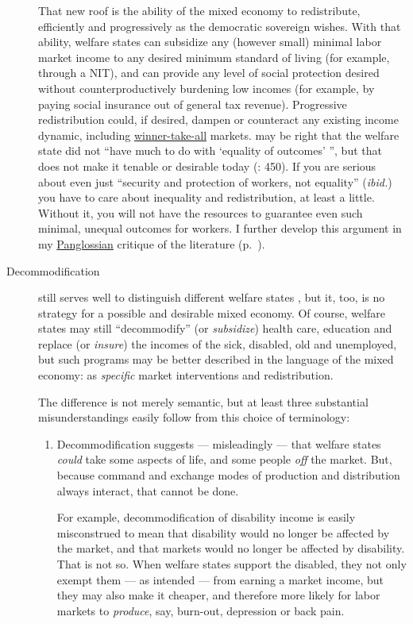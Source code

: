\begin{description}
	That new roof is the ability of the mixed economy to redistribute, efficiently and progressively as the democratic sovereign wishes. With that ability, welfare states can subsidize any (however small) minimal labor market income to any desired minimum standard of living (for example, through a \gls{NIT}), and can provide any level of social protection desired without counterproductively burdening low incomes (for example, by paying social insurance out of general tax revenue). Progressive redistribution could, if desired, dampen or counteract any existing income dynamic, including \hyperref[sec:winner-take-all]{winner-take-all} markets. \citeauthor{Offe2003} may be right that the welfare state did not ``have much to do with `equality of outcomes' '', but that does not make it tenable or desirable today (\citeyear{Offe2003}: 450). If you are serious about even just ``security and protection of workers, not equality'' (\emph{ibid.}) you have to care about inequality and redistribution, at least a little. Without it, you will not have the resources to guarantee even such minimal, unequal outcomes for workers. I further develop this argument  in my \hyperref[sec:Pangloss]{Panglossian} critique of the literature (p.~\pageref{sec:Pangloss}).

	\item[Decommodification] still serves well to distinguish different welfare states \citep{Esping-Andersen-1990-aa}, but it, too, is no strategy for a possible and desirable mixed economy.  Of course, welfare states may still ``decommodify'' (or \emph{subsidize}) health care, education and replace (or \emph{insure}) the incomes of the sick, disabled, old and unemployed, but such programs may be better described in the language of the mixed economy: as \emph{specific} market interventions and redistribution. 
	
	The difference is not merely semantic, but at least three substantial misunderstandings easily follow from this choice of terminology:
	\begin{enumerate}
		\item Decommodification suggests --- misleadingly --- that welfare states \emph{could} take some aspects of life, and some people \emph{off} the market. But, because command and exchange modes of production and distribution always interact, that cannot be done. 
		
		For example, decommodification of disability income is easily misconstrued to mean that disability would no longer be affected by the market, and that markets would no longer be affected by disability. That is not so. When welfare states support the disabled, they not only exempt them --- as intended --- from earning a market income, but they may also make it cheaper, and therefore more likely for labor markets to \emph{produce}, say, burn-out, depression or back pain. 
		

\end{enumerate}
\end{description}
